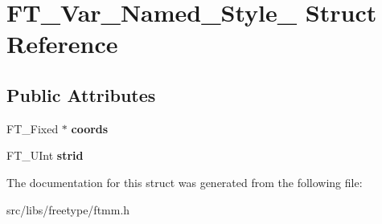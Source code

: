 \hypertarget{struct_f_t___var___named___style__}{
\section{FT\_\-Var\_\-Named\_\-Style\_\- Struct Reference}
\label{struct_f_t___var___named___style__}
}
\subsection*{Public Attributes}
\begin{DoxyCompactItemize}
\item 
\hypertarget{struct_f_t___var___named___style___a07195d55aee541db651ef3a8b04bb41f}{
FT\_\-Fixed $\ast$ {\bfseries coords}}
\label{struct_f_t___var___named___style___a07195d55aee541db651ef3a8b04bb41f}

\item 
\hypertarget{struct_f_t___var___named___style___a7802f6958c6e883bdce16b9931002826}{
FT\_\-UInt {\bfseries strid}}
\label{struct_f_t___var___named___style___a7802f6958c6e883bdce16b9931002826}

\end{DoxyCompactItemize}


The documentation for this struct was generated from the following file:\begin{DoxyCompactItemize}
\item 
src/libs/freetype/ftmm.h\end{DoxyCompactItemize}
